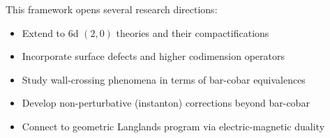 \begin{remark}
This framework opens several research directions:
\begin{itemize}
\item Extend to 6d $(2,0)$ theories and their compactifications
\item Incorporate surface defects and higher codimension operators
\item Study wall-crossing phenomena in terms of bar-cobar equivalences
\item Develop non-perturbative (instanton) corrections beyond bar-cobar
\item Connect to geometric Langlands program via electric-magnetic duality
\end{itemize}
\end{remark}

